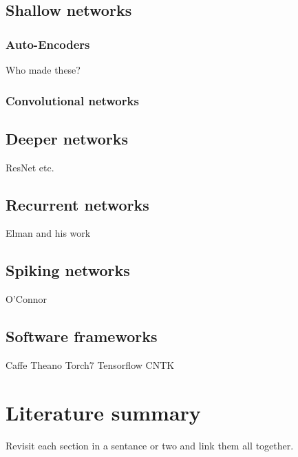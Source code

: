 \pagebreak

\subsection{Shallow networks}  

\subsubsection{Auto-Encoders}  %
Who made these?

\subsubsection{Convolutional networks}

\pagebreak
\subsection{Deeper networks}   %
ResNet etc.

\pagebreak
\subsection{Recurrent networks}  %
Elman and his work\cite{elman1990}

\pagebreak
\subsection{Spiking networks}    %
O'Connor

\pagebreak
\subsection{Software frameworks}   %
Caffe Theano Torch7 Tensorflow CNTK


\section{Literature summary}      %
Revisit each section in a sentance or two and link them all together.



